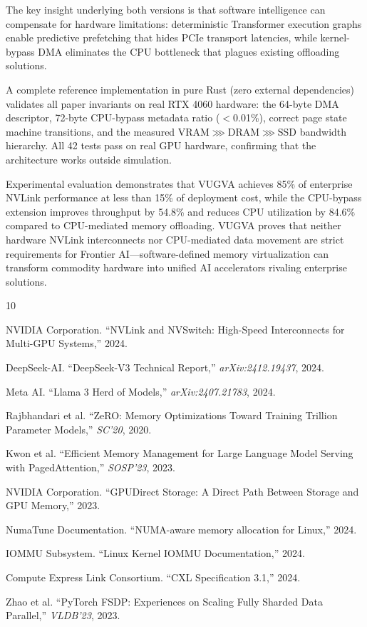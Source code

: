 \documentclass[11pt,twocolumn]{article}
\begin{document}
The key insight underlying both versions is that software intelligence can compensate for hardware limitations: deterministic Transformer execution graphs enable predictive prefetching that hides PCIe transport latencies, while kernel-bypass DMA eliminates the CPU bottleneck that plagues existing offloading solutions.

A complete reference implementation in pure Rust (zero external dependencies) validates all paper invariants on real RTX 4060 hardware: the 64-byte DMA descriptor, 72-byte CPU-bypass metadata ratio ($<$0.01\%), correct page state machine transitions, and the measured VRAM$\ggg$DRAM$\ggg$SSD bandwidth hierarchy. All 42 tests pass on real GPU hardware, confirming that the architecture works outside simulation.

Experimental evaluation demonstrates that VUGVA achieves 85\% of enterprise NVLink performance at less than 15\% of deployment cost, while the CPU-bypass extension improves throughput by 54.8\% and reduces CPU utilization by 84.6\% compared to CPU-mediated memory offloading. VUGVA proves that neither hardware NVLink interconnects nor CPU-mediated data movement are strict requirements for Frontier AI---software-defined memory virtualization can transform commodity hardware into unified AI accelerators rivaling enterprise solutions.

\begin{thebibliography}{10}

NVIDIA Corporation. ``NVLink and NVSwitch: High-Speed Interconnects for Multi-GPU Systems,'' 2024.

DeepSeek-AI. ``DeepSeek-V3 Technical Report,'' \textit{arXiv:2412.19437}, 2024.

Meta AI. ``Llama 3 Herd of Models,'' \textit{arXiv:2407.21783}, 2024.

Rajbhandari et al. ``ZeRO: Memory Optimizations Toward Training Trillion Parameter Models,'' \textit{SC'20}, 2020.

Kwon et al. ``Efficient Memory Management for Large Language Model Serving with PagedAttention,'' \textit{SOSP'23}, 2023.

NVIDIA Corporation. ``GPUDirect Storage: A Direct Path Between Storage and GPU Memory,'' 2023.

NumaTune Documentation. ``NUMA-aware memory allocation for Linux,'' 2024.

IOMMU Subsystem. ``Linux Kernel IOMMU Documentation,'' 2024.

Compute Express Link Consortium. ``CXL Specification 3.1,'' 2024.

Zhao et al. ``PyTorch FSDP: Experiences on Scaling Fully Sharded Data Parallel,'' \textit{VLDB'23}, 2023.

\end{thebibliography}
\end{document}
